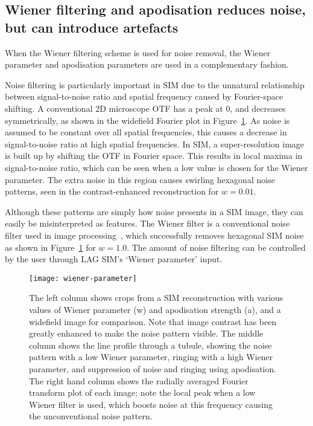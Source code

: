 \subsection{Wiener filtering and apodisation reduces noise, but can introduce artefacts}
When the Wiener filtering scheme is used for noise removal, the Wiener parameter and apodisation parameters are used in a complementary fashion. 

Noise filtering is particularly important in SIM due to the unnatural relationship between signal-to-noise ratio and spatial frequency caused by Fourier-space shifting. 
A conventional 2D microscope OTF has a peak at 0, and decreases symmetrically, as shown in the widefield Fourier plot in Figure~\ref{fig:wiener-parameter}. 
As noise is assumed to be constant over all spatial frequencies, this causes a decrease in signal-to-noise ratio at high spatial frequencies. 
In SIM, a super-resolution image is built up by shifting the OTF in Fourier space. 
This results in local maxima in signal-to-noise ratio, which can be seen when a low value is chosen for the Wiener parameter. 
The extra noise in this region causes swirling hexagonal noise patterns, seen in the contrast-enhanced reconstruction for $w=0.01$. 

Although these patterns are simply how noise presents in a SIM image, they can easily be misinterpreted as features. 
The Wiener filter is a conventional noise filter used in image processing~\cite[\textit{ch. 4}]{brown2012introduction}, which successfully removes hexagonal SIM noise as shown in Figure~\ref{fig:wiener-parameter} for $w=1.0$. 
The amount of noise filtering can be controlled by the user through LAG SIM's `Wiener parameter' input. 


\begin{figure}[p]
\centering
\texttt{[image: wiener-parameter]}
\caption[LAG SIM: The Wiener parameter and apodisation strength must be chosen to minimise artefacts]{The left column shows crops from a SIM reconstruction with various values of Wiener parameter (w) and apodisation strength (a), and a widefield image for comparison. Note that image contrast has been greatly enhanced to make the noise pattern visible. The middle column shows the line profile through a tubule, showing the noise pattern with a low Wiener parameter, ringing with a high Wiener parameter, and suppression of noise and ringing using apodisation. The right hand column shows the radially averaged Fourier transform plot of each image; note the local peak when a low Wiener filter is used, which boosts noise at this frequency causing the unconventional noise pattern.}
\label{fig:wiener-parameter}
\end{figure}

